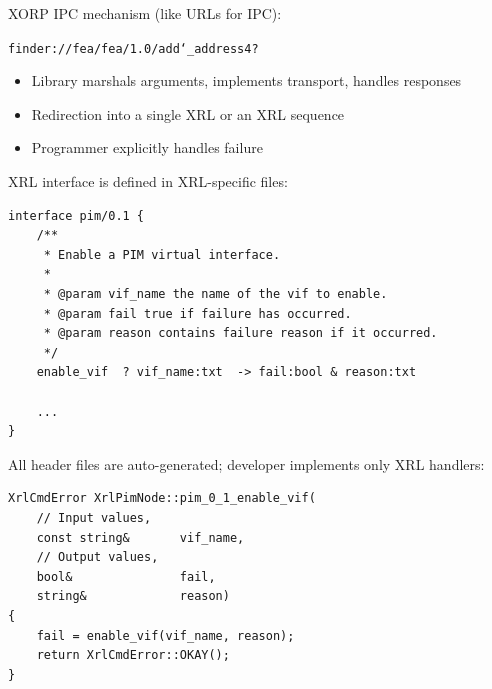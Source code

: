 \documentclass[landscape]{icsislides}
\begin{document}
\begin{slide}

XORP IPC mechanism (like URLs for IPC):

\begin{center}
\texttt{finder://fea/fea/1.0/add\char`\_address4?}
\vskip20pt
\end{center}

\begin{itemize}
  \item Library marshals arguments, implements transport, handles responses
  \item Redirection into a single XRL or an XRL sequence
  \item Programmer explicitly handles failure
\end{itemize}

\end{slide}

\begin{slide}

XRL interface is defined in XRL-specific files:

\begin{verbatim}
interface pim/0.1 {
	/**
	 * Enable a PIM virtual interface.
	 *
	 * @param vif_name the name of the vif to enable.
	 * @param fail true if failure has occurred.
	 * @param reason contains failure reason if it occurred.
	 */
	enable_vif	? vif_name:txt	-> fail:bool & reason:txt

	...
}
\end{verbatim}

\end{slide}

\begin{slide}

All header files are auto-generated; developer implements only XRL handlers:

\begin{verbatim}
XrlCmdError XrlPimNode::pim_0_1_enable_vif(
    // Input values, 
    const string&       vif_name, 
    // Output values, 
    bool&               fail,
    string&             reason)
{
    fail = enable_vif(vif_name, reason);
    return XrlCmdError::OKAY();
}
\end{verbatim}

\end{slide}
\end{document}
